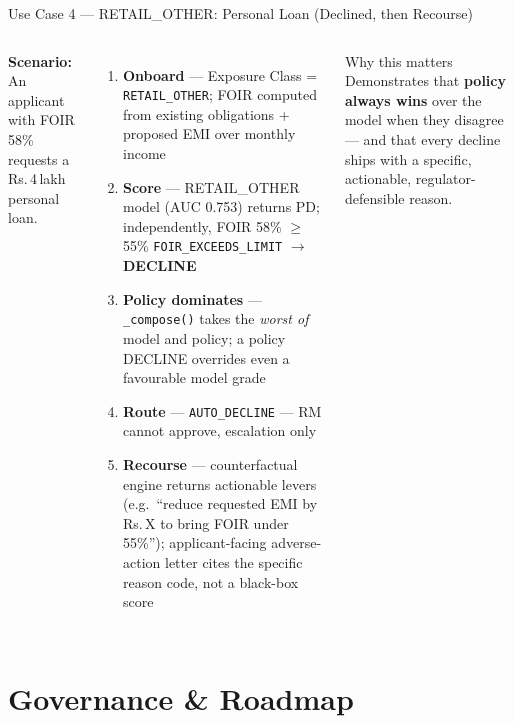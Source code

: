 \documentclass[9pt,aspectratio=169]{beamer}
\begin{document}
\begin{frame}{Use Case 4 --- RETAIL\_OTHER: Personal Loan (Declined, then Recourse)}
\vspace{-2pt}
\begin{columns}[T]
    \footnotesize
    \textbf{Scenario:} An applicant with FOIR 58\% requests a Rs.\,4\,lakh personal loan.
    \begin{enumerate}\setlength\itemsep{4pt}
      \item[\textbf{1.}] \textbf{Onboard} --- Exposure Class = \texttt{RETAIL\_OTHER};
            FOIR computed from existing obligations + proposed EMI over monthly income
      \item[\textbf{2.}] \textbf{Score} --- RETAIL\_OTHER model (AUC 0.753) returns PD;
            independently, FOIR 58\% $\geq$ 55\% \texttt{FOIR\_EXCEEDS\_LIMIT} $\to$ \textbf{DECLINE}
      \item[\textbf{3.}] \textbf{Policy dominates} --- \texttt{\_compose()} takes the
            \emph{worst of} model and policy; a policy DECLINE overrides even a favourable model grade
      \item[\textbf{4.}] \textbf{Route} --- \texttt{AUTO\_DECLINE} --- RM cannot approve, escalation only
      \item[\textbf{5.}] \textbf{Recourse} --- counterfactual engine returns actionable levers
            (e.g.\ ``reduce requested EMI by Rs.\,X to bring FOIR under 55\%''); applicant-facing
            adverse-action letter cites the specific reason code, not a black-box score
    \end{enumerate}
    \begin{block}{Why this matters}
      \footnotesize
      Demonstrates that \textbf{policy always wins} over the model when they disagree --- and that
      every decline ships with a specific, actionable, regulator-defensible reason.
    \end{block}
\end{columns}
\end{frame}

\section{Governance \& Roadmap}
\end{document}
